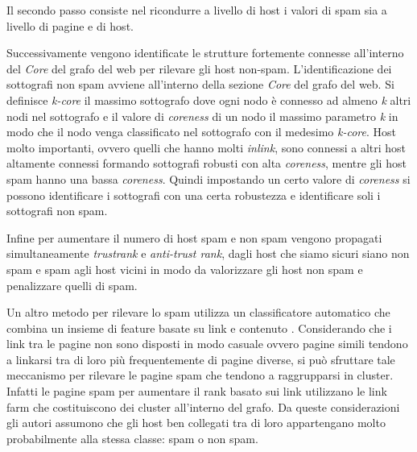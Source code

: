 Il secondo passo consiste nel ricondurre  a livello di host i valori di spam sia a livello di pagine e di host.

Successivamente vengono identificate le strutture fortemente connesse all'interno del \textit{Core} del grafo del web per rilevare gli host non-spam. L'identificazione dei sottografi non spam avviene all'interno della sezione \textit{Core} del grafo del web. Si definisce \textit{k-core} il massimo sottografo dove ogni nodo è connesso ad almeno \textit{k} altri nodi nel sottografo e il valore di \textit{coreness} di un nodo il massimo parametro \textit{k} in modo che il nodo venga classificato nel sottografo con il medesimo \textit{k-core}. Host molto importanti, ovvero quelli che hanno molti \textit{inlink}, sono connessi a altri host altamente connessi formando sottografi robusti con alta \textit{coreness}, mentre gli host spam hanno una bassa \textit{coreness}. Quindi impostando un certo valore di \textit{coreness} si possono identificare i sottografi con una certa robustezza e identificare soli i sottografi non spam.

Infine per aumentare il numero di host spam e non spam vengono propagati simultaneamente \textit{trustrank} e \textit{anti-trust rank}, dagli host che siamo sicuri siano non spam e spam agli host vicini in modo da valorizzare gli host non spam e penalizzare quelli di spam.

Un altro metodo per rilevare lo spam utilizza un classificatore automatico che combina un insieme di feature basate su link e contenuto \cite{Castillo:2007:KYN:1277741.1277814}. Considerando che i link tra le pagine non sono disposti in modo casuale ovvero pagine simili tendono a linkarsi tra di loro più frequentemente di pagine diverse, si può sfruttare tale meccanismo per rilevare le pagine spam che tendono a raggrupparsi in cluster. Infatti le pagine spam per aumentare il rank basato sui link utilizzano le link farm che costituiscono dei cluster all'interno del grafo. Da queste considerazioni gli autori assumono che gli host ben collegati tra di loro appartengano molto probabilmente alla stessa classe: spam o non spam.

